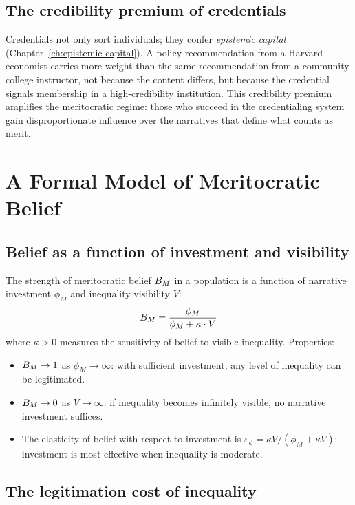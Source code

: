\subsection{The credibility premium of credentials}

Credentials not only sort individuals; they confer \emph{epistemic capital} (Chapter~\ref{ch:epistemic-capital}).
A policy recommendation from a Harvard economist carries more weight than the same recommendation from a community college instructor, not because the content differs, but because the credential signals membership in a high-credibility institution.
This credibility premium amplifies the meritocratic regime: those who succeed in the credentialing system gain disproportionate influence over the narratives that define what counts as merit.

\section{A Formal Model of Meritocratic Belief}
\label{sec:ch22-model}

\subsection{Belief as a function of investment and visibility}

\begin{model}
\label{mod:meritocracy}
The strength of meritocratic belief $B_{M}$ in a population is a function of narrative investment $\phi_M$ and inequality visibility $V$:
\[
  B_{M} = \frac{\phi_M}{\phi_M + \kappa \cdot V}
\]
where $\kappa > 0$ measures the sensitivity of belief to visible inequality.
Properties:
\begin{itemize}[nosep]
  \item $B_{M} \to 1$ as $\phi_M \to \infty$: with sufficient investment, any level of inequality can be legitimated.
  \item $B_{M} \to 0$ as $V \to \infty$: if inequality becomes infinitely visible, no narrative investment suffices.
  \item The elasticity of belief with respect to investment is $\varepsilon_{\phi} = \kappa V / (\phi_M + \kappa V)$: investment is most effective when inequality is moderate.
\end{itemize}
\end{model}

\subsection{The legitimation cost of inequality}

